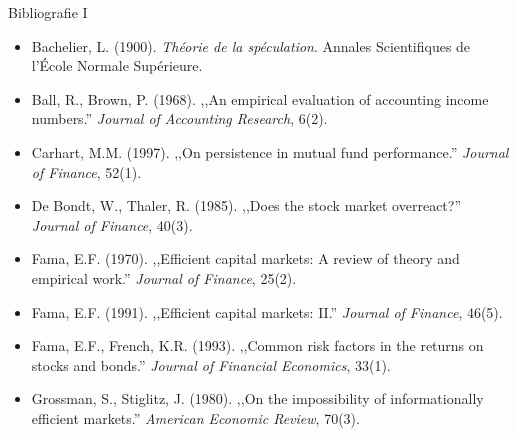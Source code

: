 \documentclass[9pt, aspectratio=169, t]{beamer}
\theoremstyle{definition}
\newenvironment{cminipage}[1]{%
    \par\noindent\hfill\begin{minipage}{#1}\ignorespaces
}{%
    \end{minipage}\hfill\null\par
}
\begin{document}

\begin{frame}{Bibliografie I}
\begin{cminipage}{0.95\textwidth}
{\small
\begin{itemize}\setlength{\itemsep}{2pt}
    \item Bachelier, L. (1900). \textit{Th\'{e}orie de la sp\'{e}culation}. Annales Scientifiques de l'\'{E}cole Normale Sup\'{e}rieure.
    \item Ball, R., Brown, P. (1968). ,,An empirical evaluation of accounting income numbers.'' \textit{Journal of Accounting Research}, 6(2).
    \item Carhart, M.M. (1997). ,,On persistence in mutual fund performance.'' \textit{Journal of Finance}, 52(1).
    \item De Bondt, W., Thaler, R. (1985). ,,Does the stock market overreact?'' \textit{Journal of Finance}, 40(3).
    \item Fama, E.F. (1970). ,,Efficient capital markets: A review of theory and empirical work.'' \textit{Journal of Finance}, 25(2).
    \item Fama, E.F. (1991). ,,Efficient capital markets: II.'' \textit{Journal of Finance}, 46(5).
    \item Fama, E.F., French, K.R. (1993). ,,Common risk factors in the returns on stocks and bonds.'' \textit{Journal of Financial Economics}, 33(1).
    \item Grossman, S., Stiglitz, J. (1980). ,,On the impossibility of informationally efficient markets.'' \textit{American Economic Review}, 70(3).
\end{itemize}
}
\end{cminipage}
\end{frame}
\end{document}
